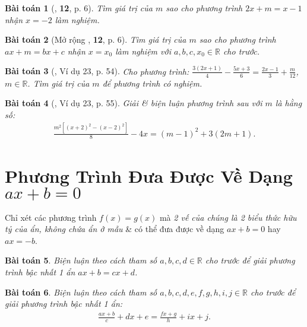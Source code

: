 \documentclass{article}
\numberwithin{equation}{section}
\newtheorem{baitoan}{Bài toán}
\begin{document}
\begin{baitoan}[\cite{SBT_Toan_8_tap_2}, \textbf{12}, p. 6]
	Tìm giá trị của $m$ sao cho phương trình $2x + m = x - 1$ nhận $x = -2$ làm nghiệm.
\end{baitoan}

\begin{baitoan}[Mở rộng \cite{SBT_Toan_8_tap_2}, \textbf{12}, p. 6]
	Tìm giá trị của $m$ sao cho phương trình $ax + m = bx + c$ nhận $x = x_0$ làm nghiệm với $a,b,c,x_0\in\mathbb{R}$ cho trước.
\end{baitoan}

\begin{baitoan}[\cite{Tuyen_Toan_8}, Ví dụ 23, p. 54]
	Cho phương trình: $\frac{3(2x + 1)}{4} - \frac{5x + 3}{6} = \frac{2x - 1}{3} + \frac{m}{12}$, $m\in\mathbb{R}$. Tìm giá trị của $m$ để phương trình có nghiệm.
\end{baitoan}

\begin{baitoan}[\cite{Tuyen_Toan_8}, Ví dụ 23, p. 55]
	Giải \& biện luận phương trình sau với $m$ là hằng số:
	\begin{align*}
		\frac{m^2[(x + 2)^2 - (x - 2)^2]}{8} - 4x = (m - 1)^2 + 3(2m + 1).
	\end{align*}
\end{baitoan}


\section{Phương Trình Đưa Được Về Dạng $ax + b = 0$}
Chỉ xét các phương trình $f(x) = g(x)$ mà \textit{2 vế của chúng là 2 biểu thức hữu tỷ của ẩn, không chứa ẩn ở mẫu} \& có thể đưa được về dạng $ax + b = 0$ hay $ax = -b$.

\begin{baitoan}
	Biện luận theo cách tham số $a,b,c,d\in\mathbb{R}$ cho trước để giải phương trình bậc nhất 1 ẩn $ax + b = cx + d$.
\end{baitoan}

\begin{baitoan}
	Biện luận theo cách tham số $a,b,c,d,e,f,g,h,i,j\in\mathbb{R}$ cho trước để giải phương trình bậc nhất 1 ẩn:
	\begin{align*}
		\frac{ax + b}{c} + dx + e = \frac{fx + g}{h} + ix + j.
	\end{align*}
\end{baitoan}
\end{document}
